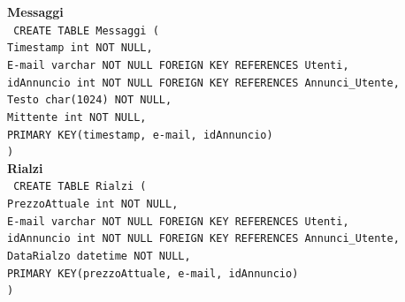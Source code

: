 \documentclass[a4paper,12pt]{report}
\begin{document}
                \noindent
                {\large \textbf{Messaggi}} \\
                \texttt{
                    CREATE TABLE Messaggi ( \\
                    \null\quad\quad Timestamp int NOT NULL, \\
                    \null\quad\quad E-mail varchar NOT NULL FOREIGN KEY REFERENCES Utenti, \\
                    \null\quad\quad idAnnuncio int NOT NULL FOREIGN KEY REFERENCES Annunci\_Utente, \\
                    \null\quad\quad Testo char(1024) NOT NULL, \\
                    \null\quad\quad Mittente int NOT NULL, \\
                    \null\quad\quad PRIMARY KEY(timestamp, e-mail, idAnnuncio) \\
                    )
                } \\

                \noindent
                {\large \textbf{Rialzi}} \\
                \texttt{
                    CREATE TABLE Rialzi ( \\
                    \null\quad\quad PrezzoAttuale int NOT NULL, \\
                    \null\quad\quad E-mail varchar NOT NULL FOREIGN KEY REFERENCES Utenti, \\
                    \null\quad\quad idAnnuncio int NOT NULL FOREIGN KEY REFERENCES Annunci\_Utente, \\
                    \null\quad\quad DataRialzo datetime NOT NULL, \\
                    \null\quad\quad PRIMARY KEY(prezzoAttuale, e-mail, idAnnuncio) \\
                    )
                } \\
\end{document}
